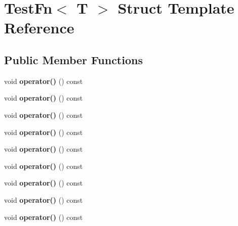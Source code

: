 \hypertarget{struct_test_fn}{}\section{Test\+Fn$<$ T $>$ Struct Template Reference}
\label{struct_test_fn}
\subsection*{Public Member Functions}
\begin{DoxyCompactItemize}
\item 
\mbox{\label{struct_test_fn_a3d0061f5a9de3dcf7fca487e21afb70e}} 
void {\bfseries operator()} () const
\item 
\mbox{\label{struct_test_fn_a3d0061f5a9de3dcf7fca487e21afb70e}} 
void {\bfseries operator()} () const
\item 
\mbox{\label{struct_test_fn_a3d0061f5a9de3dcf7fca487e21afb70e}} 
void {\bfseries operator()} () const
\item 
\mbox{\label{struct_test_fn_a3d0061f5a9de3dcf7fca487e21afb70e}} 
void {\bfseries operator()} () const
\item 
\mbox{\label{struct_test_fn_a3d0061f5a9de3dcf7fca487e21afb70e}} 
void {\bfseries operator()} () const
\item 
\mbox{\label{struct_test_fn_a3d0061f5a9de3dcf7fca487e21afb70e}} 
void {\bfseries operator()} () const
\item 
\mbox{\label{struct_test_fn_a3d0061f5a9de3dcf7fca487e21afb70e}} 
void {\bfseries operator()} () const
\item 
\mbox{\label{struct_test_fn_a3d0061f5a9de3dcf7fca487e21afb70e}} 
void {\bfseries operator()} () const
\item 
\mbox{\label{struct_test_fn_a3d0061f5a9de3dcf7fca487e21afb70e}} 
void {\bfseries operator()} () const
\item 
\mbox{\label{struct_test_fn_a3d0061f5a9de3dcf7fca487e21afb70e}} 

\end{DoxyCompactItemize}
